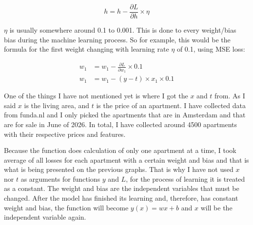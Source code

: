 \documentclass{article}
\begin{document}
\begin{equation}
h = h - \frac{\partial L}{\partial h} \times \eta
\label{eq:wb_change}
\end{equation}

$\eta$ is usually somewhere around 0.1 to 0.001. This is done to every weight/bias
bias during the machine learning process. So for example, this would be the formula
for the first weight changing with learning rate $\eta$ of 0.1, using MSE loss:


\[
\begin{split}
w_1 &= w_1 - \frac{\partial L}{\partial w_1} \times 0.1 \\
w_1 &= w_1 - (y - t) \times x_1 \times 0.1
\end{split}
\]



One of the things I have not mentioned yet is where I got the $x$ and $t$ from. As I said $x$
is the living area, and $t$ is the price of an apartment. I have collected data from funda.nl
and I only picked the apartments that are in Amsterdam and that are for sale in June of 2026.
In total, I have collected around 4500 apartments with their respective prices and features.

Because the function does calculation of only one apartment at a time, I took average of all
losses for each apartment with a certain weight and bias and that is what is being presented
on the previous graphs. That is why I have not used $x$ nor $t$ as arguments for functions $y$
and $L$, for the process of learning it is treated as a constant. The weight and bias are the
independent variables that must be changed. After the model has finished its learning and,
therefore, has constant weight and bias, the function will become $y(x) = wx + b$ and $x$
will be the independent variable again.





\end{document}
